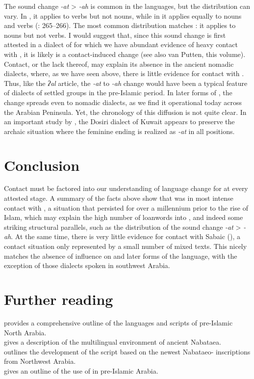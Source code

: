 \documentclass[output=paper]{langsci/langscibook}
\begin{document}
The sound change \textit{-at} > \textit{-ah} is common in the  languages, but the distribution can vary. In , it applies to verbs but not nouns, while in  it applies equally to nouns and verbs (\citealt{HuehnergardRubin2011}: 265--266). The most common  distribution matches : it applies to nouns but not verbs. I would suggest that, since this sound change is first attested in a dialect of  for which we have abundant evidence of heavy contact with , it is likely is a contact-induced change (see also van Putten, this volume). Contact, or the lack thereof, may explain its absence in the ancient nomadic dialects, where, as we have seen above, there is little evidence for contact with . Thus, like the \textit{ʔal} {article}, the \textit{-at} to \textit{-ah} change would have been a typical feature of  dialects of settled groups in the pre-Islamic period. In later forms of , the change spreads even to nomadic dialects, as we find it operational today across the Arabian Peninsula. Yet, the chronology of this {diffusion} is not quite clear. In an important study by \citet{vanPutten2017}, the Dosiri dialect of Kuwait appears to preserve the archaic situation where the feminine ending is realized as \textit{-at} in all positions.

\section{Conclusion}
Contact must be factored into our understanding of {language change} for  at every attested stage. A summary of the facts above show that  was in most intense contact with , a situation that persisted for over a millennium prior to the rise of Islam, which may explain the high number of  {loanwords} into , and indeed some striking structural parallels, such as the distribution of the sound change \textit{-at} > \textit{-ah}. At the same time, there is very little evidence for contact with Sabaic (), a contact situation only represented by a small number of mixed texts.  This nicely matches the absence of  influence on   and later forms of the language, with the exception of those dialects spoken in southwest Arabia.

\section*{Further reading}
\citet{Al-Jallad2018ANA} provides a comprehensive outline of the languages and scripts of pre-Islamic North Arabia.\\
\citet{Macdonald2003} gives a description of the multilingual environment of ancient Nabataea. \\
\citet{Nehmé2010} outlines the development of the  script based on the newest Nabataeo- inscriptions from Northwest Arabia.\\
\citet{Stein2018} gives an outline of the use of  in pre-Islamic Arabia.
\end{document}
